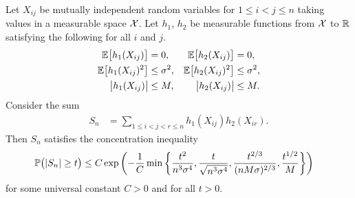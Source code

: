 \begin{lemma}
  \label{lem:dyadic_concentration}

  Let $X_{ij}$ be mutually independent random variables
  for $1 \leq i < j \leq n$
  taking values in a measurable space $\cX$.
  Let $h_1$, $h_2$
  be measurable functions from $\cX$ to $\R$
  satisfying the following
  for all $i$ and $j$.
  \begin{align*}
    \E\big[h_1(X_{ij})\big]
    &= 0,
    &\E\big[h_2(X_{ij})\big]
    &=0, \\
    \E\big[h_1(X_{ij})^2\big]
    &\leq \sigma^2,
    &\E\big[h_2(X_{ij})^2\big]
    &\leq \sigma^2, \\
    \big|h_1(X_{ij})\big|
    &\leq M,
    &\big|h_2(X_{ij})\big|
    &\leq M.
  \end{align*}
  Consider the sum
  \begin{align*}
    S_n
    &=
    \sum_{1 \leq i < j < r \leq n}
    h_1(X_{ij})
    h_2(X_{ir}).
  \end{align*}
  Then $S_n$ satisfies the concentration inequality
  \begin{align*}
    \P\big(
    |S_n| \geq t
    \big)
    &\leq
    C \exp\left(
      -\frac{1}{C}
      \min \left\{
      \frac{t^2}{n^3 \sigma^4},
      \frac{t}{\sqrt{n^3 \sigma^4}},
      \frac{t^{2/3}}{(n M \sigma)^{2/3}},
      \frac{t^{1/2}}{M}
      \right\}
    \right)
  \end{align*}
  for some universal constant
  $C > 0$
  and for all $t>0$.

\end{lemma}

